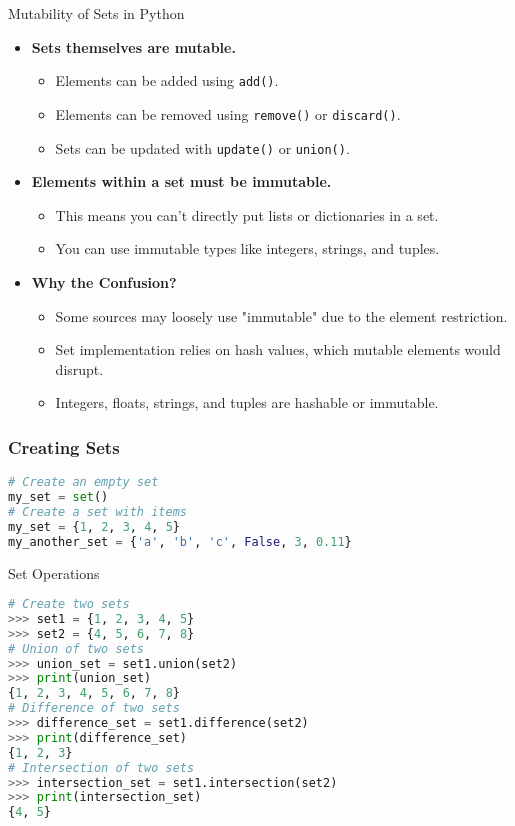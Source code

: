 \begin{frame}{Mutability of Sets in Python}
    \begin{itemize}
      \item \textbf{Sets themselves are mutable.}
        \begin{itemize}
          \item Elements can be added using \texttt{add()}.
          \item Elements can be removed using \texttt{remove()} or \texttt{discard()}.
          \item Sets can be updated with \texttt{update()} or \texttt{union()}.
        \end{itemize}
      \item \textbf{Elements within a set must be immutable.}
        \begin{itemize}
          \item This means you can't directly put lists or dictionaries in a set.
          \item You can use immutable types like integers, strings, and tuples.
        \end{itemize}
      \item \textbf{Why the Confusion?}
        \begin{itemize}
          \item Some sources may loosely use "immutable" due to the element restriction.
          \item Set implementation relies on hash values, which mutable elements would disrupt.
          \item Integers, floats, strings, and tuples are hashable or immutable.
        \end{itemize}
    \end{itemize}
\end{frame}

    \begin{frame}[fragile]
        \frametitle{Creating Sets}
        \begin{lstlisting}[style=colorful, language=Python]
# Create an empty set
my_set = set()
# Create a set with items
my_set = {1, 2, 3, 4, 5}
my_another_set = {'a', 'b', 'c', False, 3, 0.11}
        \end{lstlisting}            
    \end{frame}

\begin{frame}[fragile]{Set Operations}
    \begin{lstlisting}[style=colorful, language=Python]
# Create two sets
>>> set1 = {1, 2, 3, 4, 5}  
>>> set2 = {4, 5, 6, 7, 8}
# Union of two sets
>>> union_set = set1.union(set2)
>>> print(union_set)
{1, 2, 3, 4, 5, 6, 7, 8} 
# Difference of two sets
>>> difference_set = set1.difference(set2)
>>> print(difference_set)
{1, 2, 3}
# Intersection of two sets
>>> intersection_set = set1.intersection(set2)
>>> print(intersection_set)
{4, 5}
    \end{lstlisting}
\end{frame}

